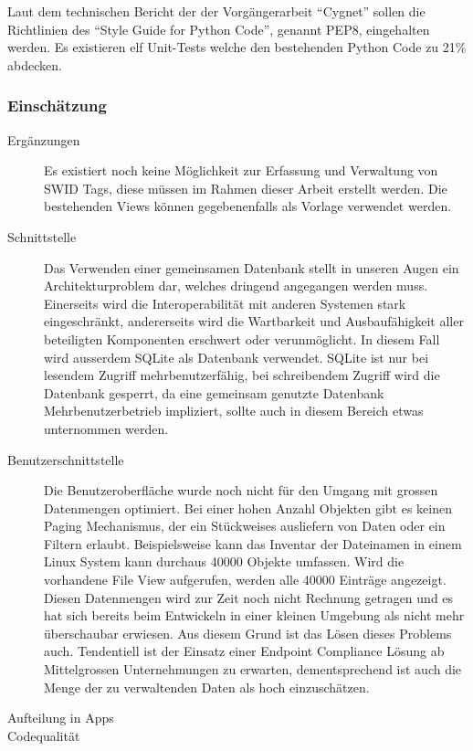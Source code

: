 Laut dem technischen Bericht der der Vorgängerarbeit
\enquote{Cygnet}\cite{cygnet:2013} sollen die Richtlinien des \enquote{Style
Guide for Python Code}\cite{PEP8:2001}, genannt PEP8, eingehalten werden. Es
existieren elf Unit-Tests welche den bestehenden Python Code zu 21\% abdecken.


\subsubsection{Einschätzung}
\begin{description}
	\item[Ergänzungen] Es existiert noch keine Möglichkeit zur Erfassung und
	Verwaltung von SWID Tags, diese müssen im Rahmen dieser Arbeit erstellt werden.
	Die bestehenden Views können gegebenenfalls als Vorlage verwendet werden.
	
	\item[Schnittstelle] Das Verwenden einer gemeinsamen Datenbank stellt in unseren
	Augen ein Architekturproblem dar, welches dringend angegangen werden muss.
	Einerseits wird die Interoperabilität mit anderen Systemen stark eingeschränkt,
	andererseits wird die Wartbarkeit und Ausbaufähigkeit aller beteiligten
	Komponenten erschwert oder verunmöglicht. In diesem Fall wird ausserdem SQLite
	als Datenbank verwendet. SQLite ist nur bei lesendem Zugriff mehrbenutzerfähig,
	bei schreibendem Zugriff wird die Datenbank gesperrt, da eine gemeinsam
	genutzte Datenbank Mehrbenutzerbetrieb impliziert, sollte auch in diesem Bereich
	etwas unternommen werden. 
	
	\item[Benutzerschnittstelle] 
	Die Benutzeroberfläche wurde noch nicht für den Umgang mit grossen Datenmengen
	optimiert. Bei einer hohen Anzahl Objekten gibt es keinen Paging Mechanismus,
	der ein Stückweises ausliefern von Daten oder ein Filtern erlaubt.
	Beispielsweise kann das Inventar der Dateinamen in einem Linux System kann
	durchaus 40000 Objekte umfassen. Wird die vorhandene File View aufgerufen,
	werden alle 40000 Einträge angezeigt.\\
	Diesen Datenmengen wird zur Zeit noch nicht Rechnung getragen und es hat sich
	bereits beim Entwickeln in einer kleinen Umgebung als nicht mehr überschaubar
	erwiesen. Aus diesem Grund ist das Lösen dieses Problems auch. Tendentiell ist
	der Einsatz einer Endpoint Compliance Lösung ab Mittelgrossen Unternehmungen zu
	erwarten, dementsprechend ist auch die Menge der zu verwaltenden Daten als hoch
	einzuschätzen.

\item[Aufteilung in Apps] 
	
\item[Codequalität]
	
	
\end{description}

